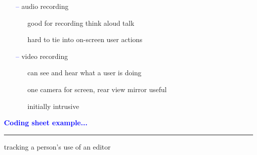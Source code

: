 \documentclass[pdf]{beamer}
\begin{document}
{{\begin{frame}
\begin{itemize}
\begin{itemize}
        \item[\textcolor{Blue}{\textbullet}] observer records events, comments, and interpretations
        \item[\textcolor{Blue}{\textbullet}] hard to get detail (writing is slow)
        \item[\textcolor{Blue}{\textbullet}] 2\textsuperscript{nd} observer helps...
      \end{itemize}
      \item[\textcolor{Blue}{--}] audio recording
      \begin{itemize}
        \item[\textcolor{Blue}{\textbullet}] good for recording think aloud talk
        \item[\textcolor{Blue}{\textbullet}] hard to tie into on-screen user actions
      \end{itemize}
      \item[\textcolor{Blue}{--}] video recording
      \begin{itemize}
        \item[\textcolor{Blue}{\textbullet}] can see and hear what a user is doing
        \item[\textcolor{Blue}{\textbullet}] one camera for screen, rear view mirror useful
        \item[\textcolor{Blue}{\textbullet}] initially intrusive
      \end{itemize}
    \end{itemize}
\end{frame}}



{
\begin{frame}
	\vspace{8mm}
	\textcolor{Blue}{\textbf{\large{Coding sheet example...}}}
    \textcolor{red}{\rule{10cm}{1mm}}
    tracking a person's use of an editor
    \begin{center}
\end{center}
\end{frame}}}
\end{document}
